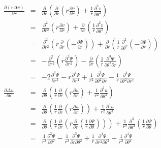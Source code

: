 \begin{eqnarray}
\frac{\partial (r  \Delta v)}{\partial r}
&=&
\frac{\partial}{\partial r} \left(   \frac{\partial }{\partial r} \left( r  \frac{\partial v}{\partial r} \right) +  \frac{1}{r} \frac{\partial^2 v}{\partial \theta^2}  \right) \\
&=&
\frac{\partial^2 }{\partial r^2} \left( r  \frac{\partial v}{\partial r} \right) 
+ \frac{\partial }{\partial r} \left( \frac{1}{r} \frac{\partial^2 v}{\partial \theta^2} \right) \\
&=&
\frac{\partial^2 }{\partial r^2} \left( r  \frac{\partial }{\partial r} ( - \frac{\partial \Psi}{\partial r}  ) \right) + \frac{\partial }{\partial r} \left( \frac{1}{r} \frac{\partial^2 }{\partial \theta^2} (- \frac{\partial \Psi}{\partial r}) \right) \\ 
&=&
- \frac{\partial^2 }{\partial r^2} \left( r    \frac{\partial^2 \Psi}{\partial r^2}   \right) - \frac{\partial }{\partial r} \left( \frac{1}{r} \frac{\partial^3 \Psi}{\partial \theta^2 \partial r}  \right) \\ 
&=& - 2  \frac{\partial^3 \Psi}{\partial r^3}  -  r \frac{\partial^4 \Psi}{\partial r^4}
+\frac{1}{r^2} \frac{\partial^3 \Psi}{\partial \theta^2 \partial r}  
- \frac{1}{r} \frac{\partial^4 \Psi}{\partial \theta^2 \partial r^2}
\\
\frac{\partial  \Delta u}{\partial \theta}
&=& \frac{\partial }{\partial \theta} \left(
\frac{1}{r} \frac{\partial }{\partial r} \left( r  \frac{\partial u}{\partial r} \right) 
+  \frac{1}{r^2} \frac{\partial^2 u}{\partial \theta^2}  \right)\\
&=& \frac{\partial }{\partial \theta} \left(
\frac{1}{r} \frac{\partial }{\partial r} \left( r  \frac{\partial u}{\partial r} \right) \right)
+  \frac{1}{r^2} \frac{\partial^3 u}{\partial \theta^3}  \\
&=& \frac{\partial }{\partial \theta} \left(
\frac{1}{r} \frac{\partial }{\partial r} \left( r  \frac{\partial }{\partial r} (  \frac{1}{r}\frac{\partial \Psi}{\partial \theta}  ) \right) \right)
+  \frac{1}{r^2} \frac{\partial^3 }{\partial \theta^3}( \frac{1}{r}\frac{\partial \Psi}{\partial \theta})  \\
&=&
\frac{1}{r^3} \frac{\partial^2 \Psi}{\partial \theta^2} - 
\frac{1}{r^2} \frac{\partial^3 \Psi}{\partial r \partial \theta^2} +
\frac{1}{r} \frac{\partial^4 \Psi}{\partial r^2 \partial \theta^2} +
\frac{1}{r^3} \frac{\partial^4 \Psi}{\partial \theta^4} 
\end{eqnarray}

